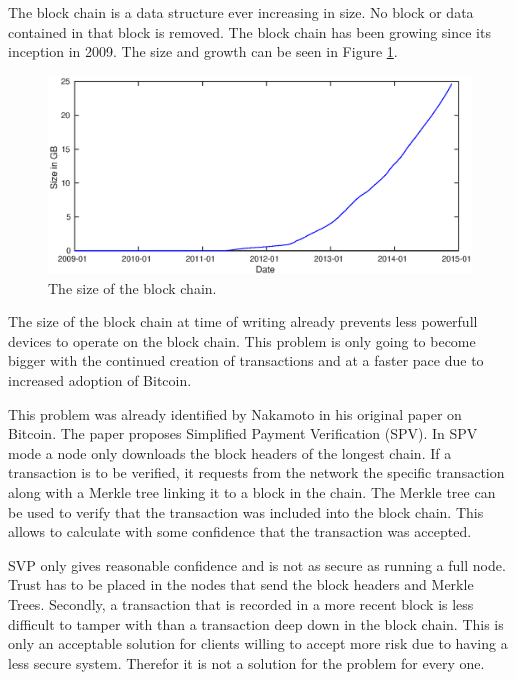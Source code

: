 The block chain is a data structure ever increasing in size.
No block or data contained in that block is removed.
The block chain has been growing since its inception in 2009.
The size and growth can be seen in Figure \ref{fig:bc-size}.

\begin{figure}
        \centerline{\includegraphics[scale=0.6]{relatedWork/figs/blockchainsize/blockchainsize.eps}}
        \caption{The size of the block chain.\cite{Blockchain.info-bcs}}
	\label{fig:bc-size}
\end{figure}

The size of the block chain at time of writing already prevents less powerfull devices
to operate on the block chain.
This problem is only going to become bigger with the continued creation of transactions
and at a faster pace due to increased adoption of Bitcoin.

This problem was already identified by Nakamoto in his original paper on Bitcoin.
The paper proposes Simplified Payment Verification (SPV).
In SPV mode a node only downloads the block headers of the longest chain.
If a transaction is to be verified, it requests from the network the specific transaction
along with a Merkle tree linking it to a block in the chain.
The Merkle tree can be used to verify that the transaction was included into the block chain.
This allows to calculate with some confidence that the transaction was accepted.

SVP only gives reasonable confidence and is not as secure as running a full node.
Trust has to be placed in the nodes that send the block headers and Merkle Trees.
Secondly, a transaction that is recorded in a more recent block is less difficult to tamper with
than a transaction deep down in the block chain.
This is only an acceptable solution for clients willing to accept more risk due to having a less secure system.
Therefor it is not a solution for the problem for every one.

